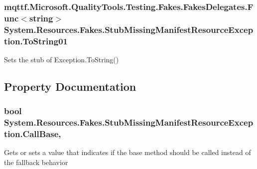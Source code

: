 \hypertarget{class_system_1_1_resources_1_1_fakes_1_1_stub_missing_manifest_resource_exception_a4c5ab4c16d16b5d5cabaf809668185dd}{
\subsubsection[{To\-String01}]{\setlength{\rightskip}{0pt plus 5cm}mqttf.\-Microsoft.\-Quality\-Tools.\-Testing.\-Fakes.\-Fakes\-Delegates.\-Func$<$string$>$ System.\-Resources.\-Fakes.\-Stub\-Missing\-Manifest\-Resource\-Exception.\-To\-String01}}\label{class_system_1_1_resources_1_1_fakes_1_1_stub_missing_manifest_resource_exception_a4c5ab4c16d16b5d5cabaf809668185dd}


Sets the stub of Exception.\-To\-String()



\subsection{Property Documentation}
\hypertarget{class_system_1_1_resources_1_1_fakes_1_1_stub_missing_manifest_resource_exception_a333ecdaa3e9eabc182ae6cf47bd1dcda}{
\subsubsection[{Call\-Base}]{\setlength{\rightskip}{0pt plus 5cm}bool System.\-Resources.\-Fakes.\-Stub\-Missing\-Manifest\-Resource\-Exception.\-Call\-Base\hspace{0.3cm}{\ttfamily [get]}, {\ttfamily [set]}}}\label{class_system_1_1_resources_1_1_fakes_1_1_stub_missing_manifest_resource_exception_a333ecdaa3e9eabc182ae6cf47bd1dcda}


Gets or sets a value that indicates if the base method should be called instead of the fallback behavior

